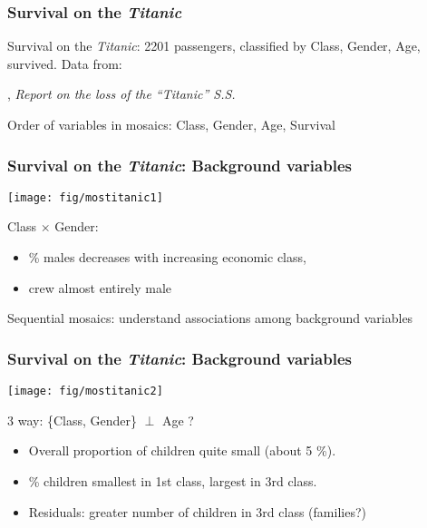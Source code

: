 
\renewcommand{\FileName}{titanic}

\begin{frame}
\frametitle{Survival on the \textit{Titanic}}

Survival on the \textit{Titanic}:  2201 passengers, classified by 
Class, Gender, Age, survived.  Data from:
\begin{itemize*}
\item \citet{Mersey:1912}, \textit{Report on the loss of the ``Titanic'' S.S.}
\item \citet{Dawson:95}
\end{itemize*}
\vspace{-10pt}


Order of variables in mosaics:  Class, Gender, Age, Survival

\end{frame}


\begin{frame}
\frametitle{Survival on the \textit{Titanic}: Background variables}

 \begin{minipage}[c]{.55\dispwidth}
  \texttt{[image: fig/mostitanic1]}
 \end{minipage}%
 \hfill
 \begin{minipage}[c]{.44\dispwidth}
Class $\times$ Gender:
  \begin{itemize}
	\item \% males decreases with increasing economic class, 
	\item crew almost entirely male
  \end{itemize}
Sequential mosaics: understand associations among background variables
 \end{minipage}
\end{frame}

\begin{frame}
\frametitle{Survival on the \textit{Titanic}: Background variables}

 \begin{minipage}[c]{.55\dispwidth}
  \texttt{[image: fig/mostitanic2]}
 \end{minipage}%
 \hfill
 \begin{minipage}[c]{.44\dispwidth}
3 way: \{Class, Gender\} $\perp$ Age ?

  \begin{itemize}
	\item Overall proportion of children quite small (about 5 \%).
	\item \% children smallest in 1st class, largest in 3rd class.
	\item Residuals: greater number of children in 3rd class (families?)
  \end{itemize}
 \end{minipage}
\end{frame}


